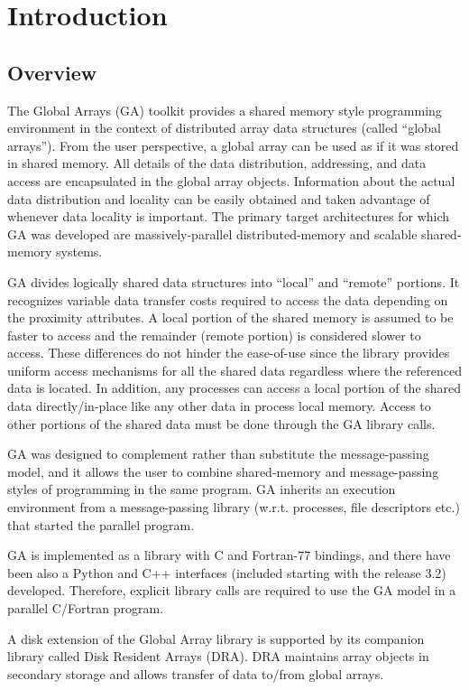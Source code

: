 \chapter{Introduction}

\section{Overview}

The Global Arrays (GA) toolkit provides a shared memory style programming
environment in the context of distributed array data structures (called
``global arrays''). From the user perspective, a global array can be used as if
it was stored in shared memory. All details of the data distribution,
addressing, and data access are encapsulated in the global array objects.
Information about the actual data distribution and locality can be easily
obtained and taken advantage of whenever data locality is important. The
primary target architectures for which GA was developed are massively-parallel
distributed-memory and scalable shared-memory systems. 

GA divides logically shared data structures into ``local'' and ``remote''
portions. It recognizes variable data transfer costs required to access the
data depending on the proximity attributes. A local portion of the shared
memory is assumed to be faster to access and the remainder (remote portion) is
considered slower to access. These differences do not hinder the ease-of-use
since the library provides uniform access mechanisms for all the shared data
regardless where the referenced data is located. In addition, any processes can
access a local portion of the shared data directly/in-place like any other data
in process local memory. Access to other portions of the shared data must be
done through the GA library calls. 

GA was designed to complement rather than substitute the message-passing model,
and it allows the user to combine shared-memory and message-passing styles of
programming in the same program. GA inherits an execution environment from a
message-passing library (w.r.t. processes, file descriptors etc.) that started
the parallel program. 

GA is implemented as a library with C and Fortran-77 bindings, and there have
been also a Python and C++ interfaces (included starting with the release 3.2)
developed. Therefore, explicit library calls are required to use the GA model
in a parallel C/Fortran program. 

A disk extension of the Global Array library is supported by its companion
library called Disk Resident Arrays (DRA). DRA maintains array objects in
secondary storage and allows transfer of data to/from global arrays. 

